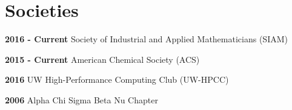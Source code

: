 \documentclass[letterpaper]{radler-resume-class}
\begin{document}
\begin{minipage}[t]{0.65\textwidth}
\section{Societies} 
\sectionspace
\begin{tightitemize}
\item \textbf{2016 - Current} Society of Industrial and Applied Mathematicians (SIAM)
\item \textbf{2015 - Current} American Chemical Society (ACS)
\item \textbf{2016} UW High-Performance Computing Club (UW-HPCC)
\item \textbf{2006} Alpha Chi Sigma Beta Nu Chapter
\end{tightitemize}

\end{minipage} %
\end{document}
